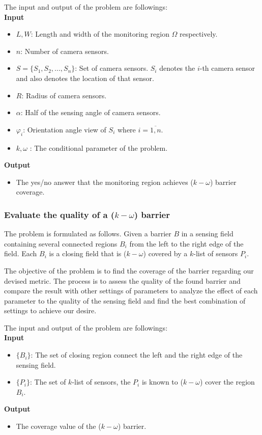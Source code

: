 \noindent The input and output of the problem are followings:\\[7pt]
{\bfseries Input}
\begin{itemize}
	\item $L, W$: Length and width of the monitoring region $\Omega$ respectively.
	\item $n$: Number of camera sensors.
	\item $S = \{S_1,S_2,...,S_n\}$: Set of camera sensors. $S_i$ denotes the $i$-th camera sensor and also denotes the location of that sensor.
	\item $R$: Radius of camera sensors.
	\item $\alpha$: Half of the sensing angle of camera sensors.
	\item $\varphi_i$: Orientation angle view of $S_i$ where $i=\overline{1,n}$.
	\item $k, \omega$ : The conditional parameter of the problem.
\end{itemize}
{\bfseries Output}
\begin{itemize}
	\item The yes/no answer that the monitoring region achieves ($k-\omega$) barrier coverage. 
\end{itemize}

\subsubsection{Evaluate the quality of a ($k-\omega$) barrier}
The problem is formulated as follows. Given a barrier $B$ in a sensing field containing several connected regions $B_i$ from the left to the right edge of the field. Each $B_i$ is a closing field that is ($k-\omega$) covered by a $k$-list of sensors $P_i$.

The objective of the problem is to find the coverage of the barrier regarding our devised metric. The process is to assess the quality of the found barrier and compare the result with other settings of parameters to analyze the effect of each parameter to the quality of the sensing field and find the best combination of settings to achieve our desire.

\noindent The input and output of the problem are followings:\\[7pt]
{\bfseries Input}
\begin{itemize}
	\item $\{B_i\}$: The set of closing region connect the left and the right edge of the sensing field.
	\item $\{P_i\}$: The set of $k$-list of sensors, the $P_i$ is known to ($k-\omega$) cover the region $B_i$.
\end{itemize}
{\bfseries Output}
\begin{itemize}
	\item The coverage value of the ($k-\omega$) barrier.
\end{itemize}